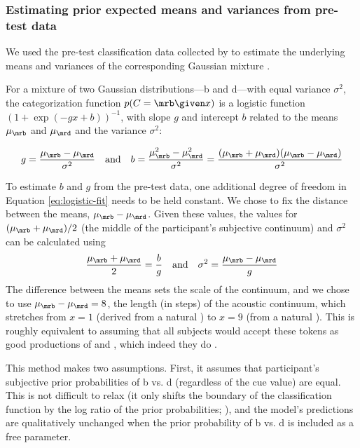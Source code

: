 \subsubsection{Estimating prior expected means and variances from pre-test data}
\label{sec:prior-expected-means}

We used the pre-test classification data collected by  to estimate the underlying means and variances of the corresponding Gaussian mixture \cite{Feldman2009a}.

For a mixture of two Gaussian distributions---\ph b and \ph d---with equal variance $\sigma^2$, the categorization function $p(C=\mrb \given x)$ is a logistic function $(1+\exp(-gx + b))^{-1}$, with slope $g$ and intercept $b$ related to the means $\mu_\mrb$ and $\mu_\mrd$ and the variance $\sigma^2$:

\begin{equation}
\label{eq:logistic-fit}
g = \frac{\mu_\mrb-\mu_\mrd}{\sigma^2} \quad \mathrm{and} \quad b= \frac{\mu_\mrb^2 - \mu_\mrd^2}{\sigma^2} = \frac{(\mu_\mrb + \mu_\mrd)(\mu_\mrb - \mu_\mrd)}{\sigma^2}
\end{equation}

To estimate $b$ and $g$ from the pre-test data, one additional degree of freedom in Equation \ref{eq:logistic-fit} needs to be held constant. We chose to fix the distance between the means, $\mu_\mrb-\mu_\mrd$.  Given these values, the values for $(\mu_\mrb+\mu_\mrd)/2$ (the middle of the participant's subjective continuum) and $\sigma^2$ can be calculated using
\begin{equation}
\label{eq:prior-vals}
\frac{\mu_\mrb+\mu_\mrd}{2} = \frac{b}{g} \quad\mathrm{and}\quad \sigma^2 = \frac {\mu_\mrb-\mu_\mrd}{g}
\end{equation}
The difference between the means sets the scale of the continuum, and we chose to use $\mu_\mrb-\mu_\mrd=8$, the length (in steps) of the acoustic continuum, which stretches from $x=1$ (derived from a natural ) to $x=9$ (from a natural ).  This is roughly equivalent to assuming that all subjects would accept these tokens as good productions of  and , which indeed they do \cite{Vroomen2004}.

This method makes two assumptions.  First, it assumes that participant's subjective prior probabilities of \ph b vs. \ph d (regardless of the cue value) are equal.  This is not difficult to relax (it only shifts the boundary of the classification function by the log ratio of the prior probabilities; ), and the model's predictions are qualitatively unchanged when the prior probability of \ph b vs. \ph d is included as a free parameter.

